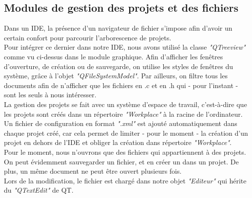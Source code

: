 \documentclass[a4paper,12pt]{article}
\begin{document}
			
		\subsection{Modules de gestion des projets et des fichiers}
		
		Dans un IDE, la présence d’un navigateur de fichier s’impose afin d’avoir un certain confort pour parcourir l’arborescence de projets.\\
		Pour intégrer ce dernier dans notre IDE, nous avons utilisé la classe \textit{"QTreeview"} comme vu ci-dessus dans le module graphique. Afin d'afficher les fenêtres d'ouverture, de création ou de sauvegarde, on utilise les styles de fenêtres du système, grâce à l'objet \textit{"QFileSystemModel"}. Par ailleurs, on filtre tous les documents afin de n'afficher que les fichiers en .c et en .h qui - pour l'instant - sont les seuls à nous intéresser.\\
		
		La gestion des projets se fait avec un système d'espace de travail, c’est-à-dire que les projets sont créés dans un répertoire \textit{"Workplace"} à la racine de l’ordinateur. Un fichier de configuration en format \textit{".xml"} est ajouté automatiquement dans chaque projet créé, car cela permet de limiter - pour le moment - la création d’un projet en dehors de l’IDE et obliger la création dans répertoire \textit{"Workplace"}.\\
		
		Pour le moment, nous n'ouvrons que des fichiers qui appartiennent à des projets. On peut évidemment sauvegarder un fichier, et en créer un dans un projet. De plus, un même document ne peut être ouvert plusieurs fois.\\
		Lors de la modification, le fichier est chargé dans notre objet \textit{"Editeur"} qui hérite du \textit{"QTextEdit"} de QT.
		
\end{document}
